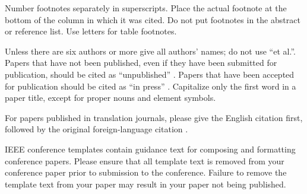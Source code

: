 \documentclass[conference,a4paper]{IEEEtran}
\begin{document}
Number footnotes separately in superscripts. Place the actual footnote at 
the bottom of the column in which it was cited. Do not put footnotes in the 
abstract or reference list. Use letters for table footnotes.

Unless there are six authors or more give all authors' names; do not use 
``et al.''. Papers that have not been published, even if they have been 
submitted for publication, should be cited as ``unpublished'' \cite{b4}. Papers 
that have been accepted for publication should be cited as ``in press'' \cite{b5}. 
Capitalize only the first word in a paper title, except for proper nouns and 
element symbols.

For papers published in translation journals, please give the English 
citation first, followed by the original foreign-language citation \cite{b6}.


%
% 
%


IEEE conference templates contain guidance text for composing and formatting conference papers. Please ensure that all template text is removed from your conference paper prior to submission to the conference. Failure to remove the template text from your paper may result in your paper not being published.
\end{document}
